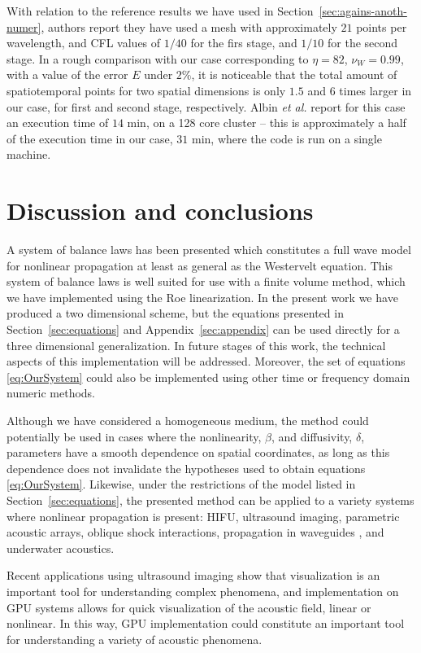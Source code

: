 With relation to the reference results \citep{albin} we have used in Section~\ref{sec:agains-anoth-numer}, authors report they have used a mesh with approximately $21$ points per wavelength, and CFL values of $1/40$ for the firs stage, and $1/10$ for the second stage. 
In a rough comparison with our case corresponding to $\eta=82$, $\nu_W=0.99$, with a value of the error $E$ under $2\%$, it is noticeable that the total amount of spatiotemporal points for two spatial dimensions is only $1.5$ and $6$ times larger in our case, for first and second stage, respectively.
Albin {\em et al.} report for this case an execution time of $14$ min, on a 128 core cluster -- this is approximately a half of the execution time in our case, $31$ min, where the code is run on a single machine.

\section{Discussion and conclusions}
\label{sec:disc-concl}

A system of balance laws has been presented which constitutes a full wave model for nonlinear propagation at least as general as the Westervelt equation. 
This system of balance laws is well suited for use with a finite volume method, which we have  implemented using the Roe linearization. 
In the present work we have produced a two dimensional scheme, but the equations presented in Section~\ref{sec:equations} and Appendix~\ref{sec:appendix} can be used directly for a three dimensional generalization. 
In future stages of this work, the technical aspects of this implementation will be addressed. 
Moreover, the set of equations \eqref{eq:OurSystem} could also be implemented using other time or frequency domain numeric methods.

Although we have considered a homogeneous medium, the method could potentially be used in cases where the nonlinearity, $\beta$, and diffusivity, $\delta$, parameters have a smooth dependence on spatial coordinates, as long as this dependence does not invalidate the hypotheses used to obtain equations \eqref{eq:OurSystem}. 
Likewise, under the restrictions of the model listed in Section~\ref{sec:equations}, the presented method can be applied to a variety systems where nonlinear propagation is present: 
HIFU, 
ultrasound imaging, 
parametric acoustic arrays, 
oblique shock interactions,
propagation in waveguides \citep{rendon2010nonlinear}, 
and underwater acoustics. 

Recent applications using ultrasound imaging \citep{pinton2009heterogeneous, okita2011development} show that visualization is an important tool for understanding complex phenomena, and implementation on GPU systems allows for quick visualization of the acoustic field, linear or nonlinear. 
In this way, GPU implementation could constitute an important tool for understanding a variety of acoustic phenomena.

